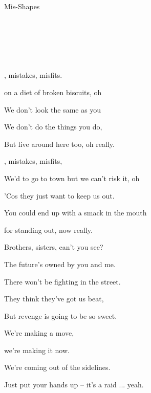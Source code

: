 \begin{song}{Mis-Shapes}{


	\mbox{ \AMaj \EMaj \Fshm \DMaj \DSeven}


	\mbox{ \GMaj \GMajSeven \GSeven \CMaj \CMajSeven \CSeven }
	

	\mbox{ \Em \EmSix \EmaddC }

}

	 \begin{SongVerse}
		, mistakes, misfits. 

		 on a diet of broken biscuits, oh 

		We don't look the same as you 
		
		We don't do the things you do,
		
		But  live around here too, oh really. 
	 \end{SongVerse}

	 \begin{SongVerse}
		, mistakes, misfits,

		We'd  to go to town but we can't risk it, oh \ch{F\#m}{} 

		'Cos they just want to keep us out. \ch{D}{} 
		
		You could end up with a smack in the mouth

		 for standing out, now really.
	 \end{SongVerse}

	 \begin{SongVerse}

		Brothers, sisters, can't you see? 

		The future's owned by you and \ch{F\#m}me. 

		There won't be fighting in the street. 

		They think they've got us beat, 

		But revenge is going to be so sweet. 
	\end{SongVerse}

	\begin{SongVerse}
		
		 \quad We're making a move, 

		we're making it now. 

		We're coming out of the sidelines. 

		\quad Just put your hands up -- it's a raid ... yeah.


\end{SongVerse}
\end{song}
